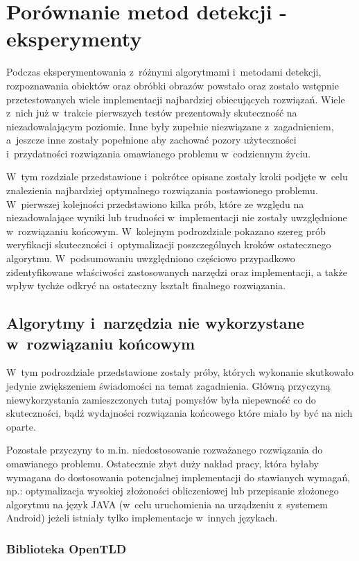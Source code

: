 \chapter{Porównanie metod detekcji - eksperymenty}

Podczas eksperymentowania z~różnymi algorytmami i~metodami detekcji,
rozpoznawania obiektów oraz obróbki obrazów powstało
oraz zostało wstępnie przetestowanych wiele implementacji
najbardziej obiecujących rozwiązań. Wiele z~nich już w~trakcie
pierwszych testów prezentowały skuteczność na niezadowalającym
poziomie. Inne były zupełnie niezwiązane z~zagadnieniem,
a~jeszcze inne zostały popełnione aby zachować pozory użyteczności 
i~przydatności rozwiązania omawianego problemu w~codziennym życiu.

W~tym rozdziale przedstawione i~pokrótce opisane zostały kroki podjęte
w~celu znalezienia najbardziej optymalnego rozwiązania postawionego 
problemu. 
W~pierwszej kolejności przedstawiono kilka prób, które ze względu
na niezadowalające wyniki lub trudności w~implementacji
nie zostały uwzględnione w~rozwiązaniu końcowym. W~kolejnym podrozdziale
pokazano szereg prób weryfikacji skuteczności i~optymalizacji 
poszczególnych kroków ostatecznego algorytmu. W~podsumowaniu uwzględniono
częściowo przypadkowo zidentyfikowane właściwości zastosowanych
narzędzi oraz implementacji, a także wpływ tychże odkryć na ostateczny
kształt finalnego rozwiązania.

\section{Algorytmy i~narzędzia nie wykorzystane w~rozwiązaniu końcowym}

W~tym podrozdziale przedstawione zostały próby, których wykonanie
skutkowało jedynie zwiększeniem świadomości na temat zagadnienia.
Główną przyczyną niewykorzystania zamieszczonych tutaj pomysłów
była niepewność co do skuteczności, bądź wydajności rozwiązania końcowego
które miało by być na nich oparte.

Pozostałe przyczyny to m.in. niedostosowanie rozważanego rozwiązania
do omawianego problemu. Ostatecznie zbyt duży nakład pracy, która
byłaby wymagana do dostosowania potencjalnej implementacji do
stawianych wymagań, np.: optymalizacja wysokiej złożoności obliczeniowej
lub przepisanie złożonego algorytmu na język JAVA
(w~celu uruchomienia na urządzeniu z~systemem Android)
jeżeli istniały tylko implementacje w~innych językach.

\subsection{Biblioteka OpenTLD}

